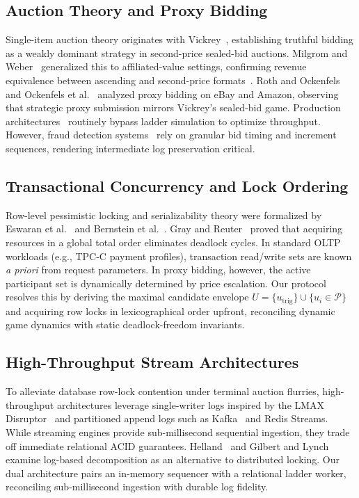 \documentclass[conference]{IEEEtran}
\begin{document}
\subsection{Auction Theory and Proxy Bidding}
Single-item auction theory originates with Vickrey~\cite{Vickrey1961}, establishing
truthful bidding as a weakly dominant strategy in second-price sealed-bid auctions.
Milgrom and Weber~\cite{Milgrom1982} generalized this to affiliated-value settings,
confirming revenue equivalence between ascending and second-price formats~\cite{Krishna2009}.
Roth and Ockenfels~\cite{Roth2002} and Ockenfels et al.~\cite{Ockenfels2006} analyzed
proxy bidding on eBay and Amazon, observing that strategic proxy submission mirrors
Vickrey's sealed-bid game. Production architectures~\cite{Shoup2004} routinely bypass
ladder simulation to optimize throughput. However, fraud detection systems~\cite{Trevathan2007,Ford2010}
rely on granular bid timing and increment sequences, rendering intermediate log preservation
critical.

\subsection{Transactional Concurrency and Lock Ordering}
Row-level pessimistic locking and serializability theory were formalized by Eswaran
et al.~\cite{Eswaran1976} and Bernstein et al.~\cite{Bernstein1987}. Gray and
Reuter~\cite{Gray1992} proved that acquiring resources in a global total order eliminates
deadlock cycles. In standard OLTP workloads (e.g., TPC-C payment profiles), transaction
read/write sets are known \emph{a priori} from request parameters. In proxy bidding,
however, the active participant set is dynamically determined by price escalation.
Our protocol resolves this by deriving the maximal candidate envelope
$U = \{u_{\text{trig}}\} \cup \{u_i \in \mathcal{P}\}$ and acquiring row locks in
lexicographical order upfront, reconciling dynamic game dynamics with static deadlock-freedom
invariants.

\subsection{High-Throughput Stream Architectures}
To alleviate database row-lock contention under terminal auction flurries, high-throughput
architectures leverage single-writer logs inspired by the LMAX Disruptor~\cite{Thompson2011}
and partitioned append logs such as Kafka~\cite{Kreps2011,Kleppmann2017} and Redis Streams.
While streaming engines provide sub-millisecond sequential ingestion, they trade off
immediate relational ACID guarantees. Helland~\cite{Helland2007} and Gilbert and
Lynch~\cite{Gilbert2002} examine log-based decomposition as an alternative to distributed
locking. Our dual architecture pairs an in-memory sequencer with a relational ladder worker,
reconciling sub-millisecond ingestion with durable log fidelity.
\end{document}
